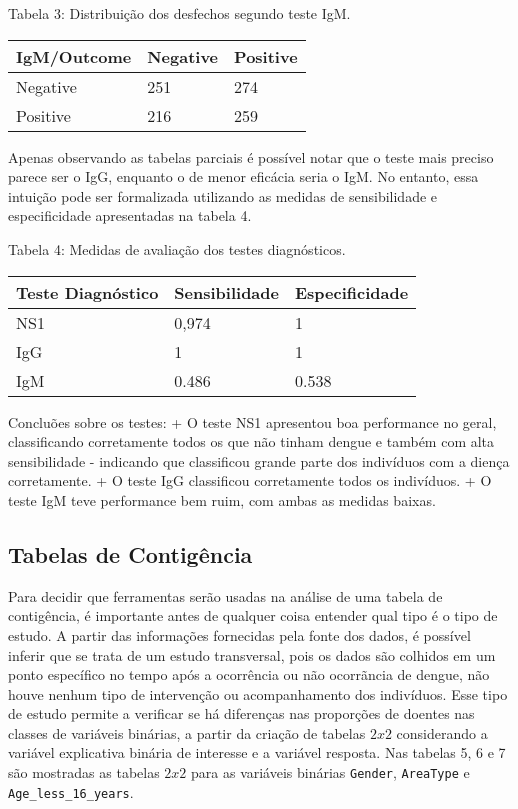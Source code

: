 \documentclass[
]{article}
\begin{document}
Tabela 3: Distribuição dos desfechos segundo teste IgM.

\begin{longtable}[]{@{}lll@{}}
\toprule\noalign{}
IgM/Outcome & Negative & Positive \\
\midrule\noalign{}
\endhead
\bottomrule\noalign{}
\endlastfoot
Negative & 251 & 274 \\
Positive & 216 & 259 \\
\end{longtable}

Apenas observando as tabelas parciais é possível notar que o teste mais
preciso parece ser o IgG, enquanto o de menor eficácia seria o IgM. No
entanto, essa intuição pode ser formalizada utilizando as medidas de
sensibilidade e especificidade apresentadas na tabela 4.

Tabela 4: Medidas de avaliação dos testes diagnósticos.

\begin{longtable}[]{@{}lll@{}}
\toprule\noalign{}
Teste Diagnóstico & Sensibilidade & Especificidade \\
\midrule\noalign{}
\endhead
\bottomrule\noalign{}
\endlastfoot
NS1 & 0,974 & 1 \\
IgG & 1 & 1 \\
IgM & 0.486 & 0.538 \\
\end{longtable}

Concluões sobre os testes: + O teste NS1 apresentou boa performance no
geral, classificando corretamente todos os que não tinham dengue e
também com alta sensibilidade - indicando que classificou grande parte
dos indivíduos com a diença corretamente. + O teste IgG classificou
corretamente todos os indivíduos. + O teste IgM teve performance bem
ruim, com ambas as medidas baixas.

\hypertarget{tabelas-de-contiguxeancia}{%
\subsection{Tabelas de Contigência}\label{tabelas-de-contiguxeancia}}

Para decidir que ferramentas serão usadas na análise de uma tabela de
contigência, é importante antes de qualquer coisa entender qual tipo é o
tipo de estudo. A partir das informações fornecidas pela fonte dos
dados, é possível inferir que se trata de um estudo transversal, pois os
dados são colhidos em um ponto específico no tempo após a ocorrência ou
não ocorrãncia de dengue, não houve nenhum tipo de intervenção ou
acompanhamento dos indivíduos. Esse tipo de estudo permite a verificar
se há diferenças nas proporções de doentes nas classes de variáveis
binárias, a partir da criação de tabelas \(2x2\) considerando a variável
explicativa binária de interesse e a variável resposta. Nas tabelas 5, 6
e 7 são mostradas as tabelas \(2x2\) para as variáveis binárias
\texttt{Gender}, \texttt{AreaType} e \texttt{Age\_less\_16\_years}.
\end{document}
